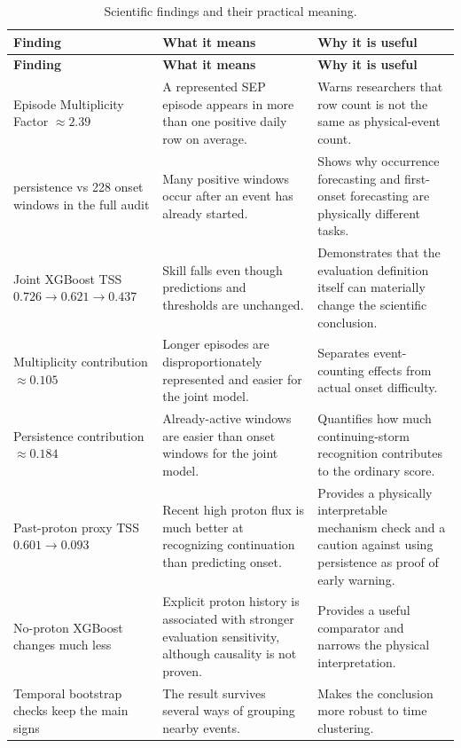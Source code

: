 \documentclass[11pt]{article}
\begin{document}
\begin{longtable}{p{}p{}p{}}
\caption{Scientific findings and their practical meaning.}\\
\toprule
\textbf{Finding} & \textbf{What it means} & \textbf{Why it is useful} \\
\midrule
\endfirsthead
\toprule
\textbf{Finding} & \textbf{What it means} & \textbf{Why it is useful} \\
\midrule
\endhead
Episode Multiplicity Factor $\approx2.39$ & A represented SEP episode appears in more than one positive daily row on average. & Warns researchers that row count is not the same as physical-event count. \\
\addlinespace
418 persistence vs 228 onset windows in the full audit & Many positive windows occur after an event has already started. & Shows why occurrence forecasting and first-onset forecasting are physically different tasks. \\
\addlinespace
Joint XGBoost TSS $0.726\rightarrow0.621\rightarrow0.437$ & Skill falls even though predictions and thresholds are unchanged. & Demonstrates that the evaluation definition itself can materially change the scientific conclusion. \\
\addlinespace
Multiplicity contribution $\approx0.105$ & Longer episodes are disproportionately represented and easier for the joint model. & Separates event-counting effects from actual onset difficulty. \\
\addlinespace
Persistence contribution $\approx0.184$ & Already-active windows are easier than onset windows for the joint model. & Quantifies how much continuing-storm recognition contributes to the ordinary score. \\
\addlinespace
Past-proton proxy TSS $0.601\rightarrow0.093$ & Recent high proton flux is much better at recognizing continuation than predicting onset. & Provides a physically interpretable mechanism check and a caution against using persistence as proof of early warning. \\
\addlinespace
No-proton XGBoost changes much less & Explicit proton history is associated with stronger evaluation sensitivity, although causality is not proven. & Provides a useful comparator and narrows the physical interpretation. \\
\addlinespace
Temporal bootstrap checks keep the main signs & The result survives several ways of grouping nearby events. & Makes the conclusion more robust to time clustering. \\

\end{longtable}
\end{document}
